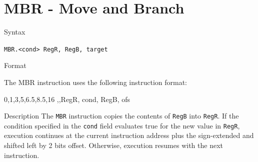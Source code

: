 %
%
\pagebreak
\section*{MBR - Move and Branch}

\begin{iPageDescEntry}{Syntax}

	\texttt{MBR.<cond> RegR, RegB, target}
    
\end{iPageDescEntry}

\begin{iPageDescEntry}{Format}

The MBR instruction uses the following instruction format:
	
\begin{flushleft}
\drawInstrFormat
  	{0,1,3,5,6.5,8.5,16}
  	{\OpCodeGrpBR,\OpCodeMBR,RegR, cond, RegB, ofs }
\end{flushleft}
\end{iPageDescEntry}

\begin{iPageDescEntry}{Description}
The \texttt{MBR} instruction copies the contents of \texttt{RegB} into \texttt{RegR}.  If the condition specified in the \texttt{cond} field evaluates true for the new value in \texttt{RegR}, execution continues at the current instruction address plus the sign-extended and shifted left by 2 bits  offset. Otherwise, execution resumes with the next instruction.
\end{iPageDescEntry}

